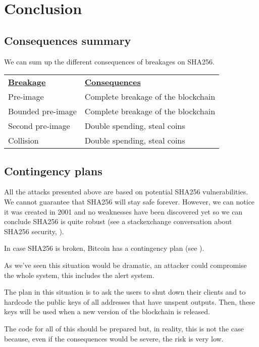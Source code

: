 \section{Conclusion}

  \subsection{Consequences summary}

We can sum up the different consequences of breakages on SHA256. \newline

\begin{tabular}{ll}

  \underline{\textbf{Breakage}} & \underline{\textbf{Consequences}} \\
  Pre-image & Complete breakage of the blockchain \\
  Bounded pre-image & Complete breakage of the blockchain \\
  Second pre-image & Double spending, steal coins \\
  Collision & Double spending, steal coins \\

\end{tabular}

  \subsection{Contingency plans}

All the attacks presented above are based on potential SHA256 vulnerabilities. We cannot guarantee that SHA256 will stay safe forever. However, we can notice it was created in 2001 and no weaknesses have been discovered yet so we can conclude SHA256 is quite robust (see a stackexchange conversation about SHA256 security, \cite{SHA256_security}). \newline

In case SHA256 is broken, Bitcoin has a contingency plan (see \cite{contingency}).

As we've seen this situation would be dramatic, an attacker could compromise the whole system, this includes the alert system.

The plan in this situation is to ask the users to shut down their clients and to hardcode the public keys of all addresses that have unspent outputs. Then, these keys will be used when a new version of the blockchain is released. \newline

The code for all of this should be prepared but, in reality, this is not the case because, even if the consequences would be severe, the risk is very low. 

